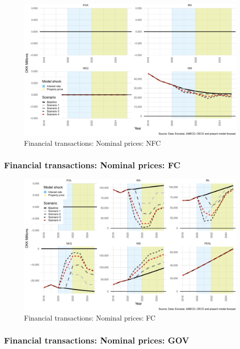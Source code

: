 \documentclass[
]{book}
\begin{document}
\begin{figure}
\centering
\includegraphics{figures/fl-fi-sfc-plot-fin-tr-NFC-1.pdf}
\caption{\label{fig:fl-fi-sfc-plot-fin-tr-NFC}Financial transactions: Nominal prices: NFC}
\end{figure}

\hypertarget{financial-transactions-nominal-prices-fc}{%
\subsubsection{Financial transactions: Nominal prices: FC}\label{financial-transactions-nominal-prices-fc}}

\begin{figure}
\centering
\includegraphics{figures/fl-fi-sfc-plot-fin-tr-FC-1.pdf}
\caption{\label{fig:fl-fi-sfc-plot-fin-tr-FC}Financial transactions: Nominal prices: FC}
\end{figure}

\hypertarget{financial-transactions-nominal-prices-gov}{%
\subsubsection{Financial transactions: Nominal prices: GOV}\label{financial-transactions-nominal-prices-gov}}
\end{document}
